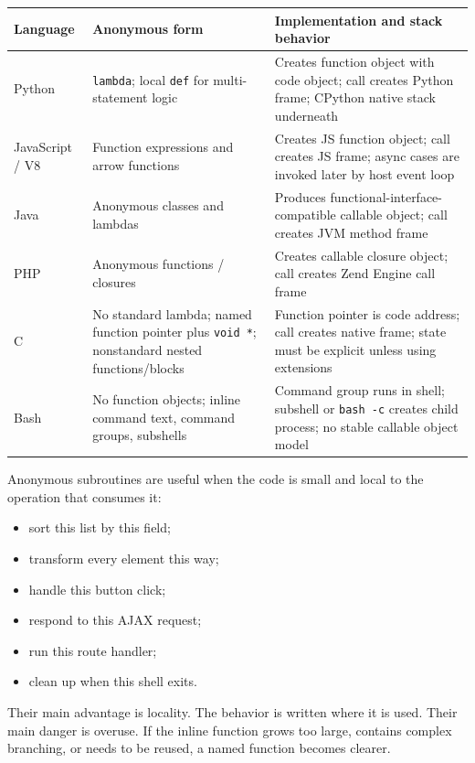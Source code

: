 \documentclass[a4paper,twoside]{report}
\begin{document}
\begin{center}
\begin{tabular}{|p{}|p{}|p{}|}
\hline
\textbf{Language} & \textbf{Anonymous form} & \textbf{Implementation and stack behavior} \\
\hline
Python & \texttt{lambda}; local \texttt{def} for multi-statement logic & Creates function object with code object; call creates Python frame; CPython native stack underneath \\
\hline
JavaScript / V8 & Function expressions and arrow functions & Creates JS function object; call creates JS frame; async cases are invoked later by host event loop \\
\hline
Java & Anonymous classes and lambdas & Produces functional-interface-compatible callable object; call creates JVM method frame \\
\hline
PHP & Anonymous functions / closures & Creates callable closure object; call creates Zend Engine call frame \\
\hline
C & No standard lambda; named function pointer plus \texttt{void *}; nonstandard nested functions/blocks & Function pointer is code address; call creates native frame; state must be explicit unless using extensions \\
\hline
Bash & No function objects; inline command text, command groups, subshells & Command group runs in shell; subshell or \texttt{bash -c} creates child process; no stable callable object model \\
\hline
\end{tabular}
\end{center}

Anonymous subroutines are useful when the code is small and local to the operation that consumes it:

\begin{itemize}
    \item sort this list by this field;
    \item transform every element this way;
    \item handle this button click;
    \item respond to this AJAX request;
    \item run this route handler;
    \item clean up when this shell exits.
\end{itemize}

Their main advantage is locality. The behavior is written where it is used. Their main danger is overuse. If the inline function grows too large, contains complex branching, or needs to be reused, a named function becomes clearer.
\end{document}
